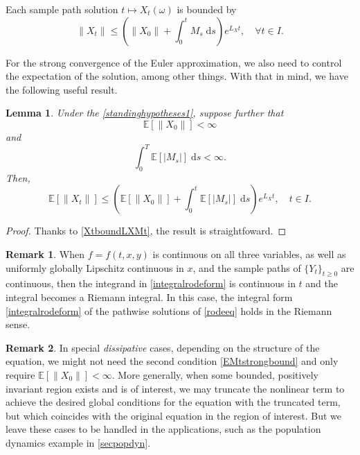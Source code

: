 \documentclass[reqno,12pt]{amsart}
\theoremstyle{plain} %
\newtheorem{lemma}{Lemma}[section]
\theoremstyle{definition} %
\newtheorem{remark}{Remark}[section]
\begin{document}
Each sample path solution $t \mapsto X_t(\omega)$ is bounded by
\begin{equation}
    \label{XtboundLXMt}
    \|X_t\| \leq \left(\|X_0\| + \int_0^t M_s\;\mathrm{d}s\right) e^{L_X t}, \quad \forall t\in I.
\end{equation}

For the strong convergence of the Euler approximation, we also need to control the expectation of the solution, among other things. With that in mind, we have the following useful result.
\begin{lemma}
    Under the \cref{standinghypotheses1}, suppose further that
    \begin{equation}
        \label{EX0strongbound}
        \mathbb{E}[\|X_0\|] < \infty
    \end{equation}
    and
    \begin{equation}
        \label{EMtstrongbound}
        \int_0^T \mathbb{E}[|M_s|] \;\mathrm{d}s < \infty.
    \end{equation}
    Then,
    \begin{equation}
        \label{EXtstrongbound}
        \mathbb{E}[\|X_t\|] \leq \left(\mathbb{E}[\|X_0\|] + \int_0^t \mathbb{E}[|M_s|]\;\mathrm{d}s\right) e^{L_X t}, \quad t\in I.
    \end{equation}
\end{lemma}

\begin{proof}
    Thanks to \eqref{XtboundLXMt}, the result is straightfoward.
\end{proof}

\begin{remark}
    When $f=f(t, x, y)$ is continuous on all three variables, as well as uniformly globally Lipschitz continuous in $x$, and the sample paths of $\{Y_t\}_{t\geq 0}$ are continuous, then the integrand in \eqref{integralrodeform} is continuous in $t$ and the integral becomes a Riemann integral. In this case, the integral form \eqref{integralrodeform} of the pathwise solutions of \eqref{rodeeq} holds in the Riemann sense.
\end{remark}

\begin{remark}
    In special \emph{dissipative} cases, depending on the structure of the equation, we might not need the second condition \eqref{EMtstrongbound} and only require $\mathbb{E}[\|X_0\|] < \infty$. More generally, when some bounded, positively invariant region exists and is of interest, we may truncate the nonlinear term to achieve the desired global conditions for the equation with the truncated term, but which coincides with the original equation in the region of interest. But we leave these cases to be handled in the applications, such as the population dynamics example in \cref{secpopdyn}.
\end{remark}
\end{document}
